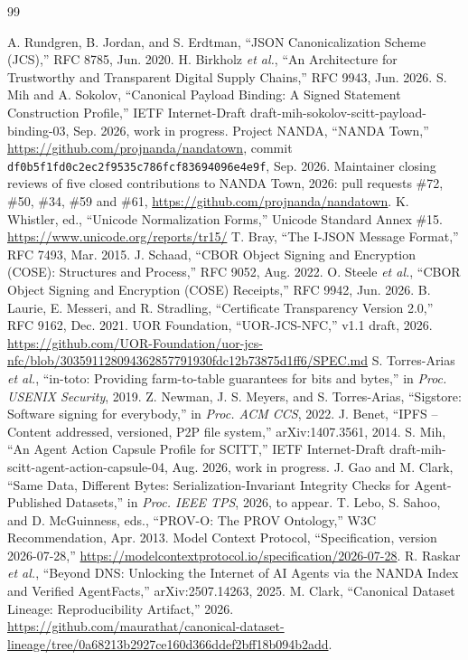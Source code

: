 \documentclass[conference]{IEEEtran}
\begin{document}
\begin{thebibliography}{99}\scriptsize\raggedright
\setlength{\itemsep}{0pt}\setlength{\parsep}{0pt}\setlength{\topsep}{0pt}
 A. Rundgren, B. Jordan, and S. Erdtman, ``JSON Canonicalization Scheme (JCS),'' RFC 8785, Jun. 2020.
 H. Birkholz \emph{et al.}, ``An Architecture for Trustworthy and Transparent Digital Supply Chains,'' RFC 9943, Jun. 2026.
 S. Mih and A. Sokolov, ``Canonical Payload Binding: A Signed Statement Construction Profile,'' IETF Internet-Draft draft-mih-sokolov-scitt-payload-binding-03, Sep. 2026, work in progress.
 Project NANDA, ``NANDA Town,'' \url{https://github.com/projnanda/nandatown}, commit \texttt{df0b5f1fd0c2ec2f9535c786fcf83694096e4e9f}, Sep. 2026.
 Maintainer closing reviews of five closed contributions to NANDA Town, 2026: pull requests \#72, \#50, \#34, \#59 and \#61, \url{https://github.com/projnanda/nandatown}.
 K. Whistler, ed., ``Unicode Normalization Forms,'' Unicode Standard Annex \#15. \url{https://www.unicode.org/reports/tr15/}
 T. Bray, ``The I-JSON Message Format,'' RFC 7493, Mar. 2015.
 J. Schaad, ``CBOR Object Signing and Encryption (COSE): Structures and Process,'' RFC 9052, Aug. 2022.
 O. Steele \emph{et al.}, ``CBOR Object Signing and Encryption (COSE) Receipts,'' RFC 9942, Jun. 2026.
 B. Laurie, E. Messeri, and R. Stradling, ``Certificate Transparency Version 2.0,'' RFC 9162, Dec. 2021.
 UOR Foundation, ``UOR-JCS-NFC,'' v1.1 draft, 2026. \url{https://github.com/UOR-Foundation/uor-jcs-nfc/blob/303591128094362857791930fdc12b73875d1ff6/SPEC.md}
 S. Torres-Arias \emph{et al.}, ``in-toto: Providing farm-to-table guarantees for bits and bytes,'' in \emph{Proc. USENIX Security}, 2019.
 Z. Newman, J. S. Meyers, and S. Torres-Arias, ``Sigstore: Software signing for everybody,'' in \emph{Proc. ACM CCS}, 2022.
 J. Benet, ``IPFS -- Content addressed, versioned, P2P file system,'' arXiv:1407.3561, 2014.
 S. Mih, ``An Agent Action Capsule Profile for SCITT,'' IETF Internet-Draft draft-mih-scitt-agent-action-capsule-04, Aug. 2026, work in progress.
 J. Gao and M. Clark, ``Same Data, Different Bytes: Serialization-Invariant Integrity Checks for Agent-Published Datasets,'' in \emph{Proc. IEEE TPS}, 2026, to appear.
 T. Lebo, S. Sahoo, and D. McGuinness, eds., ``PROV-O: The PROV Ontology,'' W3C Recommendation, Apr. 2013.
 Model Context Protocol, ``Specification, version 2026-07-28,'' \url{https://modelcontextprotocol.io/specification/2026-07-28}.
 R. Raskar \emph{et al.}, ``Beyond DNS: Unlocking the Internet of AI Agents via the NANDA Index and Verified AgentFacts,'' arXiv:2507.14263, 2025.
 M. Clark, ``Canonical Dataset Lineage: Reproducibility Artifact,'' 2026. \url{https://github.com/maurathat/canonical-dataset-lineage/tree/0a68213b2927ce160d366ddef2bff18b094b2add}.
\end{thebibliography}
\end{document}
